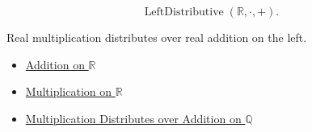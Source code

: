 \begin{remark*}
\[
\operatorname{LeftDistributive}(\mathbb{R},\cdot,+).
\]
\end{remark*}

\begin{remark*}[Interpretation]
Real multiplication distributes over real addition on the left.
\end{remark*}

\begin{dependencies}
\begin{itemize}
  \item \hyperref[def:addition-on-r]{Addition on $\mathbb{R}$}
  \item \hyperref[def:multiplication-on-r]{Multiplication on $\mathbb{R}$}
  \item \hyperref[thm:multiplication-distributes-over-addition-on-q]{Multiplication Distributes over Addition on $\mathbb{Q}$}
\end{itemize}
\end{dependencies}
